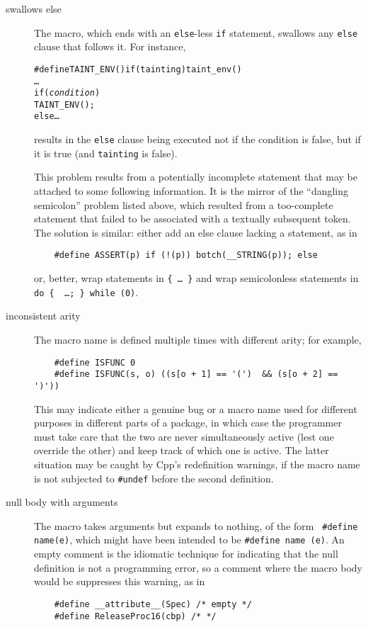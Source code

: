 \documentclass[10pt]{article}
\begin{document}
\begin{description}
\item[swallows else]
        The macro, which ends with an {\tt else}-less {\tt if} statement,
        swallows any {\tt else} clause that follows it.  For instance,
\begin{alltt}
    #define TAINT_ENV() if (tainting) taint_env()
    \ldots
    if ({\rm\em{}condition})
      TAINT_ENV();
    else \ldots
\end{alltt}
        results in the {\tt else} clause being executed not if  the
        condition is false, but if it is true (and {\tt tainting} is false).
        
        This problem results from a potentially incomplete statement that
        may be attached to some following information.  It is the mirror of
        the ``dangling semicolon'' problem listed above, which
        resulted from a too-complete statement that failed to be
        associated with a textually subsequent token.  The solution is
        similar: either add an else clause lacking a statement, as in
\begin{verbatim}
    #define ASSERT(p) if (!(p)) botch(__STRING(p)); else
\end{verbatim}
        or, better, wrap statements in {\tt \verb|{| \ldots\ \verb|}|} and
        wrap semicolonless statements in {\tt do \verb|{| {\rm
        \ldots}\verb|; }| while (0)}.

\item[inconsistent arity]
        The macro name is defined multiple times with different arity; for example,
\begin{verbatim}
    #define ISFUNC 0
    #define ISFUNC(s, o) ((s[o + 1] == '(')  && (s[o + 2] == ')'))
\end{verbatim}
        This may indicate either a genuine bug or a macro name used for
        different purposes in different parts of a package, in which case
        the programmer must take care that the two are never simultaneously
        active (lest one override the other) and keep track of which one is
        active.  The latter situation may be
        caught by Cpp's redefinition warnings, if the macro name is not
        subjected to {\tt \#undef} before the second definition.

\item[null body with arguments]
        The macro takes arguments but expands to nothing, of the form {\tt
        \#define name(e)},
        which might have been intended to be {\tt \#define name (e)}.
        An empty comment is the idiomatic technique for indicating that the
        null definition is not a programming error, so a comment where the macro
        body would be suppresses this warning, as in
\begin{verbatim}
    #define __attribute__(Spec) /* empty */
    #define ReleaseProc16(cbp) /* */
\end{verbatim}


\end{description}
\end{document}
